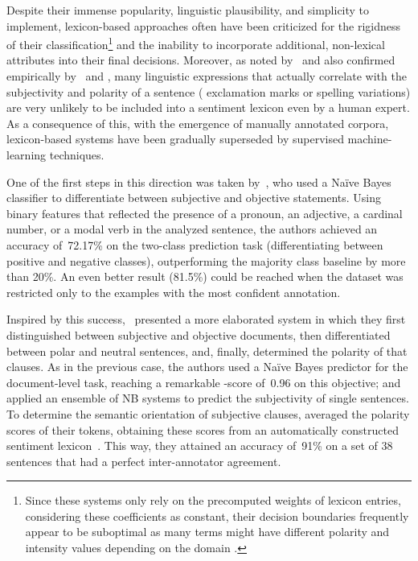 Despite their immense popularity, linguistic plausibility, and
simplicity to implement, lexicon-based approaches often have been
criticized for the rigidness of their classification\footnote{Since
  these systems only rely on the precomputed weights of lexicon
  entries, considering these coefficients as constant, their decision
  boundaries frequently appear to be suboptimal as many terms might
  have different polarity and intensity values depending on the domain
  \cite[see][]{Eisenstein:17,Yang:17}.} and the inability to
incorporate additional, non-lexical attributes into their final
decisions.  Moreover, as noted by~\citet{Pang:02} and also confirmed
empirically by~\citet{Riloff:03} and \citet{Gamon:04}, many linguistic
expressions that actually correlate with the subjectivity and polarity
of a sentence (\eg{} exclamation marks or spelling variations) are
very unlikely to be included into a sentiment lexicon even by a human
expert.  As a consequence of this, with the emergence of manually
annotated corpora, lexicon-based systems have been gradually
superseded by supervised machine-learning techniques.

One of the first steps in this direction was taken
by~\citet{Wiebe:99}, who used a Na{\"i}ve Bayes classifier to
differentiate between subjective and objective statements.  Using
binary features that reflected the presence of a pronoun, an
adjective, a cardinal number, or a modal verb in the analyzed
sentence, the authors achieved an accuracy of~72.17\% on the two-class
prediction task (differentiating between positive and negative
classes), outperforming the majority class baseline by more than 20\%.
An even better result (81.5\%) could be reached when the dataset was
restricted only to the examples with the most confident annotation.

Inspired by this success,~\citet{Yu:03} presented a more elaborated
system in which they first distinguished between subjective and
objective documents, then differentiated between polar and neutral
sentences, and, finally, determined the polarity of that clauses.  As
in the previous case, the authors used a Na{\"i}ve Bayes predictor for
the document-level task, reaching a remarkable \F-score of~0.96 on
this objective; and applied an ensemble of NB systems to predict the
subjectivity of single sentences.  To determine the semantic
orientation of subjective clauses, \citeauthor{Yu:03} averaged the
polarity scores of their tokens, obtaining these scores from an
automatically constructed sentiment lexicon~\cite{Hatzivassi:97}.
This way, they attained an accuracy of~91\% on a set of 38 sentences
that had a perfect inter-annotator agreement.

